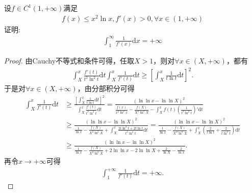 \documentclass[../../main.tex]{subfiles}%
\begin{document}
\begin{example}
设$f\in C^1(1,+\infty)$满足
\begin{align*}
f(x)\leqslant x^2\ln x, f'(x)>0,\forall x\in(1,+\infty)
\end{align*}
证明:
\begin{align*}
\int_1^\infty \frac{1}{f'(x)}\mathrm{d}x=+\infty
\end{align*}
\end{example}
\begin{proof}

由Cauchy不等式和条件可得，任取$X>1$，则对$\forall x\in (X,+\infty)$，都有
\begin{align*}
\int_X^x \frac{f'(t)}{t^2\ln^2 t}\mathrm{d}t \int_X^x \frac{1}{f'(t)}\mathrm{d}t \geqslant \left[ \int_X^x \frac{1}{t\ln t}\mathrm{d}t \right]^2.
\end{align*}
于是对$\forall x\in (X,+\infty)$，由分部积分可得
\begin{align*}
\int_X^x \frac{1}{f'(t)}\mathrm{d}t &\geqslant \frac{\left[ \int_X^x \frac{1}{t\ln t}\mathrm{d}t \right]^2}{\int_X^x \frac{f'(t)}{t^2\ln^2 t}\mathrm{d}t} = \frac{\left( \ln\ln x - \ln\ln X \right)^2}{\frac{f(x)}{x^2\ln^2 x} - \frac{f(X)}{X^2\ln^2 X} - \int_X^x f(t) \left( \frac{1}{t^2\ln^2 t} \right)' \mathrm{d}t} \\
&\geqslant \frac{\left( \ln\ln x - \ln\ln X \right)^2}{\frac{1}{\ln x} - \frac{f(X)}{X^2\ln^2 X} + \int_X^x \frac{2t\ln^2 t + 2t\ln t}{t^2\ln^3 t}\mathrm{d}t} = \frac{\left( \ln\ln x - \ln\ln X \right)^2}{\frac{1}{\ln x} - \frac{f(X)}{X^2\ln^2 X} + \int_X^x \left( \frac{2}{t\ln t} + \frac{2}{t\ln^2 t} \right)\mathrm{d}t} \\
&\geqslant \frac{\left( \ln\ln x - \ln\ln X \right)^2}{\frac{1}{\ln x} - \frac{f(X)}{X^2\ln^2 X} + 2\ln\ln x - 2\ln\ln X + \frac{2}{\ln X} - \frac{2}{\ln x}}.
\end{align*}
再令$x\rightarrow +\infty$可得
\begin{align*}
\int_1^{+\infty} \frac{1}{f'(t)}\mathrm{d}t = +\infty.
\end{align*}



\end{proof}
\end{document}
